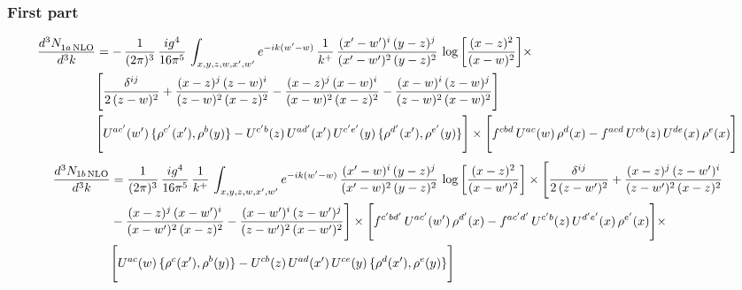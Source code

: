 \documentclass[9pt]{article}
\numberwithin{equation}{section}
\begin{document}
\subsubsection{First part}
\begin{align}
 \frac{d^{3}N_{1a\,\rm NLO}^{\rm}}{d^{3}k}  & = -\,\frac{1}{(2\pi)^{3}}\,\frac{ig^{4}}{16\pi^{5}}\,\int_{x,y,z,w,x',w^{\prime}} e^{-ik(w^{\prime}-w)}\,\frac{1}{k^{+}}\, \frac{(x'-w')^{i}\,(y-z)^{j}}{(x'-w')^{2}\,(y-z)^{2}}\,\log{\left[\frac{(x-z)^{2}}{(x-w)^{2}}\right]}\times\notag \\ &  \Bigg[\frac{\delta^{ij}}{2\,(z-w)^{2}}+\frac{(x-z)^{j}\,(z-w)^{i}}{(z-w)^{2}\,(x-z)^{2}}-\frac{(x-z)^{j}\,(x-w)^{i}}{(x-w)^{2}\,(x-z)^{2}}-\frac{(x-w)^{i}\,(z-w)^{j}}{(z-w)^{2}\,(x-w)^{2}}\Bigg] \notag \\ & \Bigg[U^{ac'}(w')\,\{\rho^{c'}(x'),\rho^{b}(y)\}-U^{c'b}(z)\,U^{ad'}(x')\,U^{c'e'}(y)\, \{\rho^{d'}(x'),\rho^{e'}(y)\}\Bigg]\times \Bigg[f^{cbd}\,U^{ac}(w)\,\rho^{d}(x)-f^{acd}\, U^{cb}(z)\,U^{de}(x)\,\rho^{e}(x)\Bigg]
\end{align}
\begin{align}
\frac{d^{3}N_{1b\, \rm NLO}}{d^{3}k} & =  \frac{1}{(2\pi)^{3}}\,\frac{ig^{4}}{16\pi^{5}}\,\frac{1}{k^{+}}\,\int_{x,y,z,w,x',w^{\prime}} e^{-ik(w^{\prime}-w)}\,  \frac{(x'-w)^{i}\,(y-z)^{j}}{(x'-w)^{2}\,(y-z)^{2}}\,\log{\left[\frac{(x-z)^{2}}{(x-w')^{2}}\right]}\times \Bigg[\frac{\delta^{ij}}{2\,(z-w')^{2}}+\frac{(x-z)^{j}\,(z-w')^{i}}{(z-w')^{2}\,(x-z)^{2}}\notag \\ &  -\frac{(x-z)^{j}\,(x-w')^{i}}{(x-w')^{2}\,(x-z)^{2}} -\frac{(x-w')^{i}\,(z-w')^{j}}{(z-w')^{2}\,(x-w')^{2}}\Bigg] \times\Bigg[f^{c'bd'}\,U^{ac'}(w')\,\rho^{d'}(x)-f^{ac'd'}\, U^{c'b}(z)\,U^{d'e'}(x)\,\rho^{e'}(x)\Bigg] \times\notag \\ &  \Bigg[U^{ac}(w)\,\{\rho^{c}(x'),\rho^{b}(y)\}-U^{cb}(z)\,U^{ad}(x')\,U^{ce}(y)\, \{\rho^{d}(x'),\rho^{e}(y)\}\Bigg]
\end{align}
\end{document}
